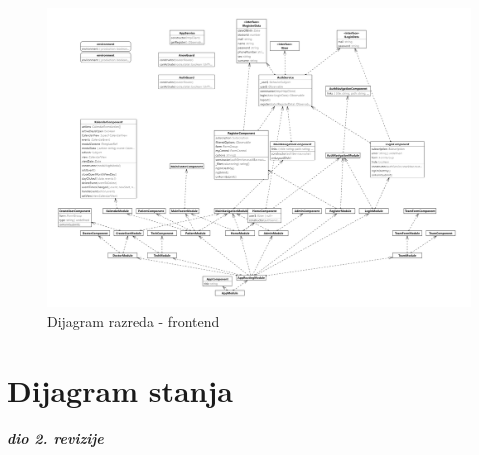 		      
		   \begin{figure}[H]
			            \includegraphics[width=\textwidth]{slike/frontend_class_diagram.png} %
			          \caption{Dijagram razreda - frontend}
			            \label{fig:class2} %
		      \end{figure}
                 
                
			
			
			
			
			
			\eject
		
		\section{Dijagram stanja}
			
			
			\textbf{\textit{dio 2. revizije}}\\
			
